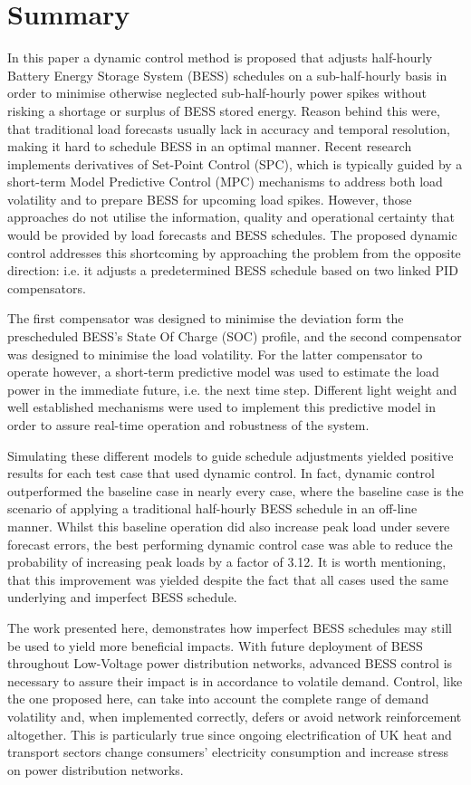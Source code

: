 \section{Summary}
\label{ch2:sec:summary}

In this paper a dynamic control method is proposed that adjusts half-hourly Battery Energy Storage System (BESS) schedules on a sub-half-hourly basis in order to minimise otherwise neglected sub-half-hourly power spikes without risking a shortage or surplus of BESS stored energy.
Reason behind this were, that traditional load forecasts usually lack in accuracy and temporal resolution, making it hard to schedule BESS in an optimal manner.
Recent research implements derivatives of Set-Point Control (SPC), which is typically guided by a short-term Model Predictive Control (MPC) mechanisms to address both load volatility and to prepare BESS for upcoming load spikes.
However, those approaches do not utilise the information, quality and operational certainty that would be provided by load forecasts and BESS schedules.
The proposed dynamic control addresses this shortcoming by approaching the problem from the opposite direction: i.e. it adjusts a predetermined BESS schedule based on two linked PID compensators.

The first compensator was designed to minimise the deviation form the prescheduled BESS's State Of Charge (SOC) profile, and the second compensator was designed to minimise the load volatility.
For the latter compensator to operate however, a short-term predictive model was used to estimate the load power in the immediate future, i.e. the next time step.
Different light weight and well established mechanisms were used to implement this predictive model in order to assure real-time operation and robustness of the system.

Simulating these different models to guide schedule adjustments yielded positive results for each test case that used dynamic control.
In fact, dynamic control outperformed the baseline case in nearly every case, where the baseline case is the scenario of applying a traditional half-hourly BESS schedule in an off-line manner.
Whilst this baseline operation did also increase peak load under severe forecast errors, the best performing dynamic control case was able to reduce the probability of increasing peak loads by a factor of 3.12.
It is worth mentioning, that this improvement was yielded despite the fact that all cases used the same underlying and imperfect BESS schedule.

The work presented here, demonstrates how imperfect BESS schedules may still be used to yield more beneficial impacts.
With future deployment of BESS throughout Low-Voltage power distribution networks, advanced BESS control is necessary to assure their impact is in accordance to volatile demand.
Control, like the one proposed here, can take into account the complete range of demand volatility and, when implemented correctly, defers or avoid network reinforcement altogether.
This is particularly true since ongoing electrification of UK heat and transport sectors change consumers' electricity consumption and increase stress on power distribution networks.
